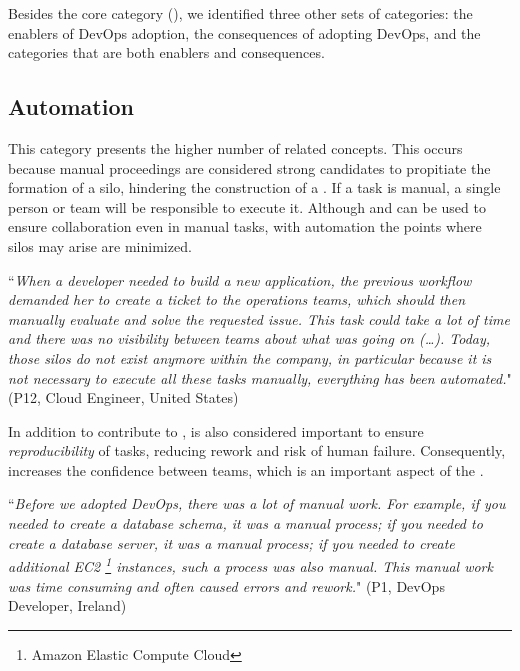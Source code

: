 Besides the core category (\cc), we identified
three other sets of categories: the enablers
of DevOps adoption, the consequences of adopting
DevOps, and the categories that are both enablers and consequences.



\subsection{Automation} \label{ssec:automation}

This category presents the higher number of related concepts. This
occurs because manual proceedings are considered strong candidates to
propitiate the formation of a silo, hindering the construction
of a \cc. If a task is manual, a single person or
team will be responsible to execute it. Although  and  can
be used to ensure collaboration even in manual tasks, with automation the
points where silos may arise are minimized.

\begin{mq}
``\emph{When a developer needed to build a new application, the previous workflow demanded her
to create a ticket to the operations teams, which should then manually evaluate and solve
the requested issue. This task could take a lot of time and there was no
visibility between teams about what was going on (\ldots). Today, those silos do not exist
anymore within the company, in particular because it is not necessary to execute all these tasks manually,
everything has been automated.}" (P12, Cloud Engineer, United States)
\end{mq}

In addition to contribute to ,  is also considered
important to ensure \emph{reproducibility} of tasks, reducing rework and risk of
human failure. Consequently,  increases the confidence
between teams, which is an important aspect of the \cc.

\begin{mq}
``\emph{Before we adopted DevOps, there was a lot of manual work. For example, if you
needed to create a database schema, it was a manual process; if you needed to create a
database server, it was a manual process; if you needed to create additional EC2 \footnote{Amazon Elastic
Compute Cloud} instances, such a process was also manual.
This manual work was time consuming and often caused errors and
rework.}" (P1, DevOps Developer, Ireland)
\end{mq}

